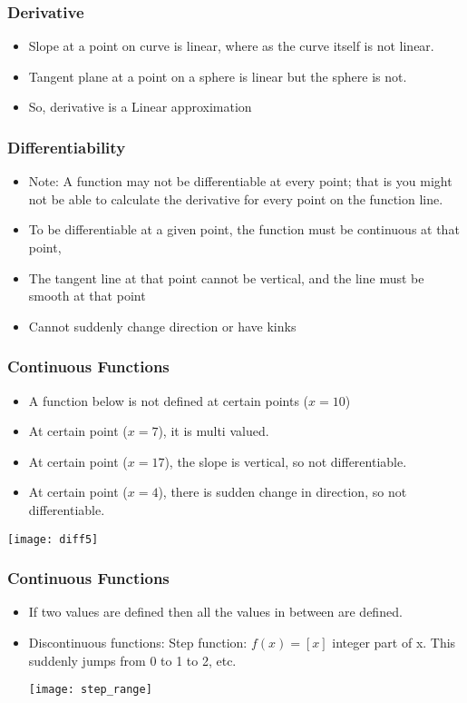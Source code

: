  \begin{frame}[fragile]\frametitle{Derivative}
\begin{itemize}
\item Slope at a point on curve is linear, where as the curve itself is not linear.
\item Tangent plane at a point on a sphere is linear but the sphere is not.
\item So, derivative is a Linear approximation
\end{itemize}
\end{frame}


 \begin{frame}[fragile]\frametitle{Differentiability}
\begin{itemize}
\item Note: A function may not be differentiable at every point; that is you might not be able to calculate the derivative for
every point on the function line. 
\item To be differentiable at a given point, the function must be continuous at that point, 
\item The tangent line at that point cannot be vertical, and the line must be smooth at that point 
\item Cannot suddenly change direction or have kinks
\end{itemize}
\end{frame}

 \begin{frame}[fragile]\frametitle{Continuous Functions}
\begin{itemize}
\item A function below is not defined at certain points ($x = 10$)
\item At certain point ($x = 7$), it is multi valued.
\item At certain point ($x = 17$), the slope is vertical, so not differentiable.
\item At certain point ($x = 4$), there is sudden change in direction, so not differentiable.
\end{itemize}
\begin{center}
\texttt{[image: diff5]}
\end{center}
\end{frame}

 \begin{frame}[fragile]\frametitle{Continuous Functions}
\begin{itemize}
\item If two values are defined then all the values in between are defined.
\item Discontinuous functions: Step function: $f(x) = [x]$ integer part of x. This suddenly jumps from 0 to 1 to 2, etc.
\begin{center}
\texttt{[image: step\_range]}
\end{center}
\end{itemize}
\end{frame}


